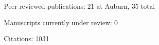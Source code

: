 \begin{veryTightItemize}
    \item Peer-reviewed publications: 21 at Auburn, 35 total
    \item Manuscripts currently under review: 0
    \item Citations: 1031
\end{veryTightItemize}
